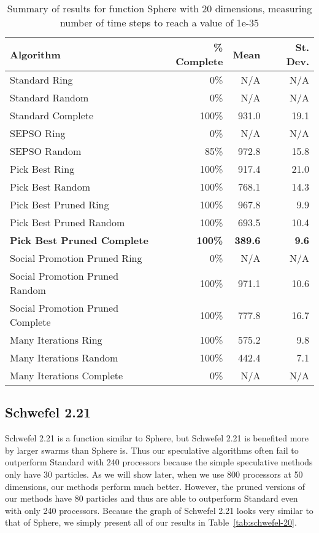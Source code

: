 \documentclass[ms,electronic,twosidetoc,letterpaper,chaptercenter,parttop,equalmargins]{byumsphd}
\newcommand{\tabref}[1]{Table~\ref{tab:#1}}
\begin{document}
\begin{table}
  \caption{Summary of results for function Sphere with 20 dimensions,
  measuring number of time steps to reach a value of 1e-35}
  \label{tab:sphere-20}
  \centering
  \begin{tabular}{|l|r|r|r|}
  \hline
  Algorithm&\% Complete&Mean&St. Dev.\\
  \hline
  \hline
  Standard Ring&0\%&N/A&N/A\\
  \hline
  Standard Random&0\%&N/A&N/A\\
  \hline
  Standard Complete&100\%&931.0&19.1\\
  \hline
  SEPSO Ring&0\%&N/A&N/A\\
  \hline
  SEPSO Random&85\%&972.8&15.8\\
  \hline
  Pick Best Ring&100\%&917.4&21.0\\
  \hline
  Pick Best Random&100\%&768.1&14.3\\
  \hline
  Pick Best Pruned Ring&100\%&967.8&9.9\\
  \hline
  Pick Best Pruned Random&100\%&693.5&10.4\\
  \hline
  \textbf{Pick Best Pruned Complete}&\textbf{100\%}&\textbf{389.6}&
    \textbf{9.6}\\
  \hline
  Social Promotion Pruned Ring&0\%&N/A&N/A\\
  \hline
  Social Promotion Pruned Random&100\%&971.1&10.6\\
  \hline
  Social Promotion Pruned Complete&100\%&777.8&16.7\\
  \hline
  Many Iterations Ring&100\%&575.2&9.8\\
  \hline
  Many Iterations Random&100\%&442.4&7.1\\
  \hline
  Many Iterations Complete&0\%&N/A&N/A\\
  \hline
  \end{tabular}
\end{table}


\subsection{Schwefel 2.21}

Schwefel 2.21 is a function similar to Sphere, but Schwefel 2.21 is benefited
more by larger swarms than Sphere is.  Thus our speculative algorithms often
fail to outperform Standard with 240 processors because the simple speculative
methods only have 30 particles.  As we will show later, when we use 800
processors at 50 dimensions, our methods perform much better.  However, the
pruned versions of our methods have 80 particles and thus are able to
outperform Standard even with only 240 processors.  Because the graph of
Schwefel 2.21 looks very similar to that of Sphere, we simply present all of
our results in \tabref{schwefel-20}.
\end{document}
